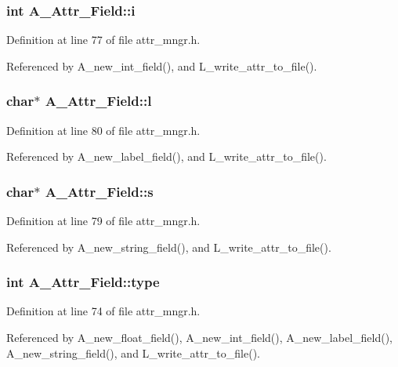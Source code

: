 \subsubsection{\setlength{\rightskip}{0pt plus 5cm}int \bf{A\_\-Attr\_\-Field::i}}\label{structA__Attr__Field_99d33ee4330ad361b5e296b0e76ff02a}




Definition at line 77 of file attr\_\-mngr.h.

Referenced by A\_\-new\_\-int\_\-field(), and L\_\-write\_\-attr\_\-to\_\-file().
\subsubsection{\setlength{\rightskip}{0pt plus 5cm}char$\ast$ \bf{A\_\-Attr\_\-Field::l}}\label{structA__Attr__Field_4f81cab31b41de640d54d331db6b71ab}




Definition at line 80 of file attr\_\-mngr.h.

Referenced by A\_\-new\_\-label\_\-field(), and L\_\-write\_\-attr\_\-to\_\-file().
\subsubsection{\setlength{\rightskip}{0pt plus 5cm}char$\ast$ \bf{A\_\-Attr\_\-Field::s}}\label{structA__Attr__Field_e48f520386cb22f8ea618b8ff377421c}




Definition at line 79 of file attr\_\-mngr.h.

Referenced by A\_\-new\_\-string\_\-field(), and L\_\-write\_\-attr\_\-to\_\-file().
\subsubsection{\setlength{\rightskip}{0pt plus 5cm}int \bf{A\_\-Attr\_\-Field::type}}\label{structA__Attr__Field_5ff369d8047105451a75fda1ca716bbf}




Definition at line 74 of file attr\_\-mngr.h.

Referenced by A\_\-new\_\-float\_\-field(), A\_\-new\_\-int\_\-field(), A\_\-new\_\-label\_\-field(), A\_\-new\_\-string\_\-field(), and L\_\-write\_\-attr\_\-to\_\-file().
